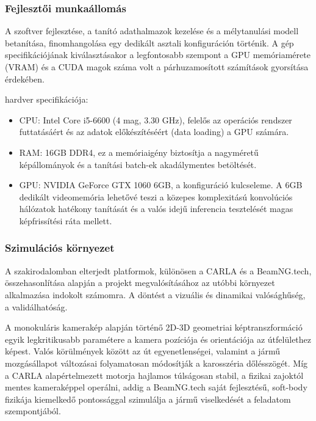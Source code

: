 \subsubsection{Fejlesztői munkaállomás}\label{fejlesztux151i-munkauxe1llomuxe1s}

A szoftver fejlesztése, a tanító adathalmazok kezelése és a mélytanulási
modell betanítása, finomhangolása egy dedikált asztali konfiguráción történik. A gép
specifikációjának kiválasztásakor a legfontosabb szempont a GPU
memóriamérete (VRAM) és a CUDA magok száma volt a párhuzamosított
számítások gyorsítása érdekében.

hardver specifikációja: 

\begin{itemize}
\item
  CPU: Intel Core i5-6600 (4 mag, 3.30 GHz), felelős az operációs
  rendszer futtatásáért és az adatok előkészítéséért (data loading) a
  GPU számára.
\item
  RAM: 16GB DDR4, ez a memóriaigény biztosítja a nagyméretű
  képállományok és a tanítási batch-ek akadálymentes betöltését.
\item
  GPU: NVIDIA GeForce GTX 1060 6GB, a konfiguráció kulcseleme. A 6GB
  dedikált videomemória lehetővé teszi a közepes komplexitású
  konvolúciós hálózatok hatékony tanítását és a valós idejű inferencia
  tesztelését magas képfrissítési ráta mellett.
\end{itemize}

\subsubsection{Szimulációs környezet}\label{szoftver-technoluxf3giuxe1k}

A szakirodalomban elterjedt platformok, különösen a CARLA és a BeamNG.tech, összehasonlítása alapján a projekt megvalósításához az utóbbi környezet alkalmazása indokolt számomra. A döntést a vizuális és dinamikai valósághűség, a validálhatóság.

A monokuláris kamerakép alapján történő 2D-3D geometriai képtranszformáció egyik legkritikusabb paramétere a kamera pozíciója és orientációja az útfelülethez képest. Valós körülmények között az út egyenetlenségei, valamint a jármű mozgásállapot változásai folyamatosan módosítják a karosszéria dőlésszögét. Míg a CARLA alapértelmezett  motorja hajlamos túlságosan stabil, a fizikai zajoktól mentes kameraképpel operálni, addig a BeamNG.tech saját fejlesztésű, soft-body fizikája kiemelkedő pontossággal szimulálja a jármű viselkedését a feladatom szempontjából.

